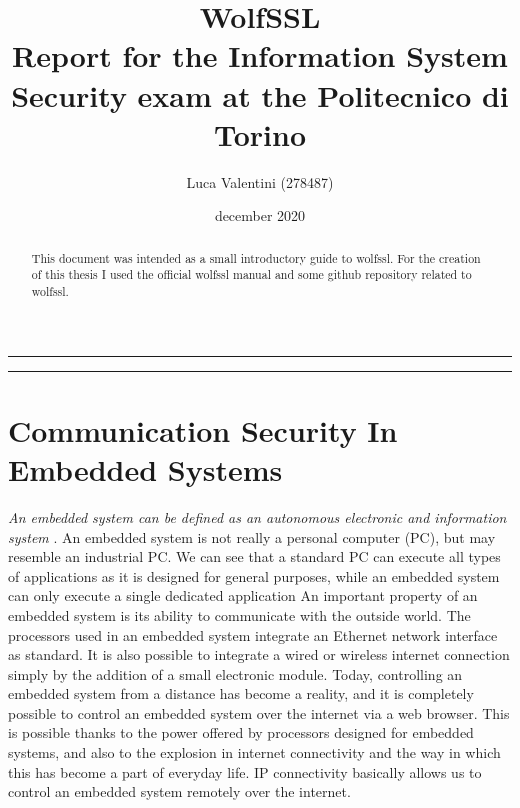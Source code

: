 \documentclass[a4paper,12pt]{article}
\begin{document}
\title{WolfSSL
\\
{\normalsize Report for the Information System Security exam at the Politecnico di Torino}
}
\author{Luca Valentini (278487)
\\
}
\date{december 2020}
\maketitle
\vfill

\rule{\textwidth}{1pt}

\tableofcontents

\rule{\textwidth}{1pt}

\vfill


\newpage
\begin{abstract}
This document was intended as a small introductory guide to wolfssl.
For the creation of this thesis I used the official wolfssl manual and some github repository related to wolfssl.
\end{abstract}
\newpage


\section{Communication Security In Embedded Systems}
\textit{An embedded system can be defined as an autonomous electronic and information system} \cite{BookEmbeddedSystems}.
An embedded system is not really a personal computer (PC), but may resemble an industrial PC.  We can see that a standard PC can execute all types of applications as it is designed for general purposes, while an embedded system can only execute a single dedicated application
An important property of an embedded system is its ability to communicate with the outside world. The processors used in an embedded system integrate an Ethernet network interface as standard. It is also possible to integrate a wired or wireless internet connection simply by the addition of a small electronic module. Today, controlling an embedded system from a distance has become a reality, and it is completely possible to control an embedded system over the internet via a web browser. This is possible thanks to the power offered by processors designed for embedded systems, and also to the explosion in internet connectivity and the way in which this has become a part of everyday life. IP connectivity basically allows us to control an embedded system remotely over the internet.
\end{document}
